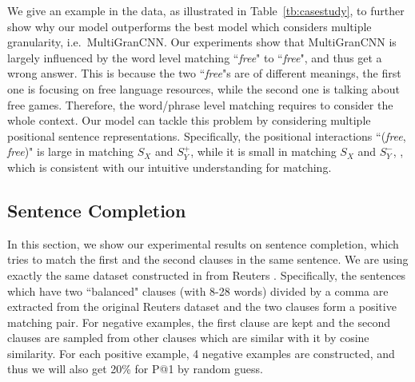 \documentclass[letterpaper]{article}
\begin{document}
We give an example in the data, as illustrated in Table~\ref{tb:casestudy}, to further show why our model outperforms the best model which considers multiple granularity, i.e.~MultiGranCNN.
Our experiments show that MultiGranCNN is largely influenced by the word level matching ``{\em free}" to ``{\em free}", and thus get a wrong answer. This is because the two ``{\em free}"s are of different meanings, the first one is focusing on free language resources, while the second one is talking about free games. Therefore, the word/phrase level matching requires to consider the whole context. Our model can tackle this problem by considering multiple positional sentence representations. Specifically, the positional interactions ``({\em free}, {\em free})" is large in matching $S_X$ and $S_Y^+$, while it is small in matching $S_X$ and $S_Y^-$, , which is consistent with our intuitive understanding for matching.

\subsection{Sentence Completion}
In this section, we show our experimental results on sentence completion, which tries to match the first and the second clauses in the same sentence.
We are using exactly the same dataset constructed in \cite{DBLP:conf/nips/HuLLC14} from Reuters \cite{Lewis:2004:RNB:1005332.1005345}.
Specifically, the sentences which have two ``balanced" clauses (with 8-28 words) divided by a comma are extracted from the original Reuters dataset and the two clauses form a positive matching pair. For negative examples, the first clause are kept and the second clauses are sampled from other clauses which are similar with it by cosine similarity.
For each positive example, 4 negative examples are constructed, and thus we will also get 20\% for P@1 by random guess.
\end{document}
